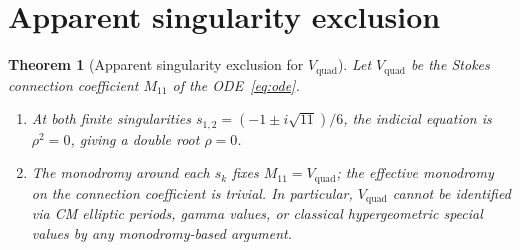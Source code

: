 \documentclass[11pt,a4paper]{article}
\newtheorem{theorem}{Theorem}[section]
\theoremstyle{definition}
\theoremstyle{remark}
\newcommand{\Vq}{V_{\mathrm{quad}}}
\begin{document}
\section{Apparent singularity exclusion}
\label{sec:frobenius}

\begin{theorem}[Apparent singularity exclusion
for $\Vq$]
\label{thm:exclusion2}
Let $\Vq$ be the Stokes connection
coefficient $M_{11}$ of the ODE~\eqref{eq:ode}.
\begin{enumerate}
\item[\textup{(i)}]
  At both finite singularities
  $s_{1,2}=(-1\pm i\sqrt{11})/6$,
  the indicial equation is $\rho^2=0$,
  giving a double root $\rho=0$.
\item[\textup{(ii)}]
  The monodromy around each $s_k$ fixes
  $M_{11}=\Vq$; the effective monodromy
  on the connection coefficient is trivial.
  In particular, $\Vq$ cannot be identified
  via CM elliptic periods, gamma values, or
  classical hypergeometric special values by
  any monodromy-based argument.
\end{enumerate}
\end{theorem}
\end{document}
